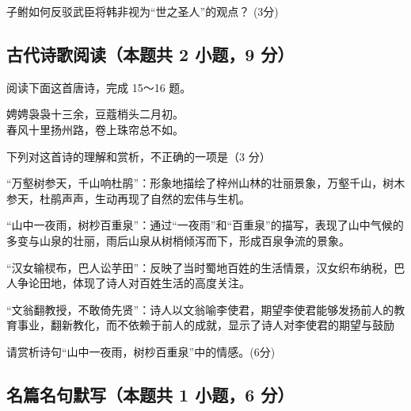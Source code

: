 \documentclass[zihao = -4]{exam-zh}
\begin{document}
       \begin{question}
         子鲋如何反驳武臣将韩非视为“世之圣人”的观点？
(3分)
       \end{question}


       \subsection{古代诗歌阅读（本题共 2 小题，9 分）}

       阅读下面这首唐诗，完成 15～16 题。


       \begin{poem}[author = 杜牧
, title = 赠别二首·其一
]
         娉娉袅袅十三余，豆蔻梢头二月初。\\
春风十里扬州路，卷上珠帘总不如。\\
       \end{poem}

       \begin{question}
         下列对这首诗的理解和赏析，不正确的一项是（3 分）
         \begin{choices}
           \item  “万壑树参天，千山响杜鹃”：形象地描绘了梓州山林的壮丽景象，万壑千山，树木参天，杜鹃声声，生动再现了自然的宏伟与生机。 

           \item  “山中一夜雨，树杪百重泉”：通过“一夜雨”和“百重泉”的描写，表现了山中气候的多变与山泉的壮丽，雨后山泉从树梢倾泻而下，形成百泉争流的景象。 

           \item   “汉女输棂布，巴人讼芋田”：反映了当时蜀地百姓的生活情景，汉女织布纳税，巴人争论田地，体现了诗人对百姓生活的高度关注。 

           \item  “文翁翻教授，不敢倚先贤”：诗人以文翁喻李使君，期望李使君能够发扬前人的教育事业，翻新教化，而不依赖于前人的成就，显示了诗人对李使君的期望与鼓励

         \end{choices}
       \end{question}

       \begin{question}
         请赏析诗句“山中一夜雨，树杪百重泉”中的情感。(6分)
       \end{question}


       \subsection{名篇名句默写（本题共 1 小题，6 分）}
\end{document}
